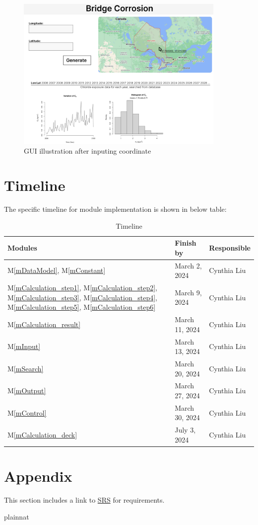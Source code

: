\documentclass[12pt, titlepage]{article}
\newcommand{\mref}[1]{M\ref{#1}}
\begin{document}
\begin{figure}[H]
\centering
\includegraphics[width=0.9\textwidth]{GUI2.png}
\caption{GUI illustration after inputing coordinate}
\label{FigGUI1}
\end{figure}

\section{Timeline}
The specific timeline for module implementation is shown in below table:
\begin{table}[H]
\centering
\begin{tabular}{p{} p{}  p{}}
\toprule
 \textbf{Modules} & \textbf{Finish by} & \textbf{Responsible} \\
\midrule
\mref{mDataModel}, \mref{mConstant} & March 2, 2024& Cynthia Liu\\
\mref{mCalculation_step1}, \mref{mCalculation_step2}, \mref{mCalculation_step3}, \mref{mCalculation_step4}, \mref{mCalculation_step5}, \mref{mCalculation_step6} & March 9, 2024& Cynthia Liu\\
\mref{mCalculation_result} & March 11, 2024& Cynthia Liu\\
\mref{mInput} & March 13, 2024 & Cynthia Liu\\
\mref{mSearch} & March 20, 2024 & Cynthia Liu\\
\mref{mOutput}  & March 27, 2024 & Cynthia Liu\\
\mref{mControl} & March 30, 2024 & Cynthia Liu\\
\mref{mCalculation_deck} & July 3, 2024 & Cynthia Liu\\

\bottomrule
\end{tabular}
\caption{Timeline}
\end{table}


\section{Appendix}
This section includes a link to \href{https://github.com/CynthiaLiu0805/BridgeCorrosion/blob/main/docs/SRS/SRS.pdf}{SRS} for requirements.


 {plainnat}


\newpage{}
\end{document}

